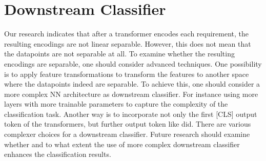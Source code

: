 \section{Downstream Classifier}
\label{chp:future_work:sec:downstream_classifier}
Our research indicates that after a transformer encodes each requirement, the resulting encodings are not linear separable.
However, this does not mean that the datapoints are not separable at all.
To examine whether the resulting encodings are separable, one should consider advanced techniques.
One possibility is to apply feature transformations to transform the features to another space where the datapoints indeed are separable.
To achieve this, one should consider a more complex \ac{NN} architecture as downstream classifier.
For instance using more layers with more trainable parameters to capture the complexity of the classification task.
Another way is to incorporate not only the first [CLS] output token of the transformers, but further output token like \textcite{Gao:2019} did.
There are various complexer choices for a downstream classifier.
Future research should examine whether and to what extent the use of more complex downstream classifier enhances the classification results.

